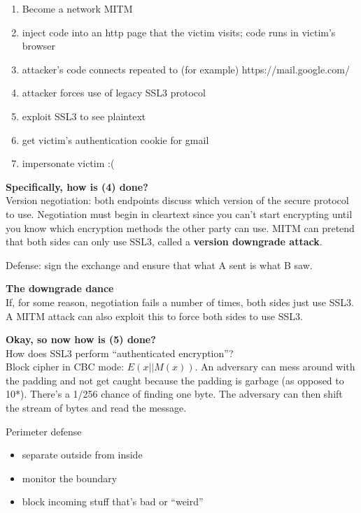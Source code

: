 
\begin{enumerate}
	\item Become a network MITM 
	\item inject code into an http page that the victim visits; code runs in victim's browser
	\item attacker's code connects repeated to (for example) https://mail.google.com/
	\item attacker forces use of legacy SSL3 protocol
	\item exploit SSL3 to see plaintext
	\item get victim's authentication cookie for gmail
	\item impersonate victim :(
\end{enumerate}

\textbf{Specifically, how is (4) done?}\\
Version negotiation: both endpoints discuss which version of the secure protocol to use. Negotiation must begin in cleartext since you can't start encrypting until you know which encryption methods the other party can use. MITM can pretend that both sides can only use SSL3, called a \textbf{version downgrade attack}.

Defense: sign the exchange and ensure that what A sent is what B saw.

\textbf{The downgrade dance}\\
If, for some reason, negotiation fails a number of times, both sides just use SSL3. A MITM attack can also exploit this to force both sides to use SSL3.

\textbf{Okay, so now how is (5) done?}\\
How does SSL3 perform ``authenticated encryption''?\\
Block cipher in CBC mode: $E(x || M(x))$. An adversary can mess around with the padding and not get caught because the padding is garbage (as opposed to 10*). There's a 1/256 chance of finding one byte. The adversary can then shift the stream of bytes and read the message.

Perimeter defense
\begin{itemize}
	\item separate outside from inside
	\item monitor the boundary
	\item block incoming stuff that's bad or ``weird''
\end{itemize}

